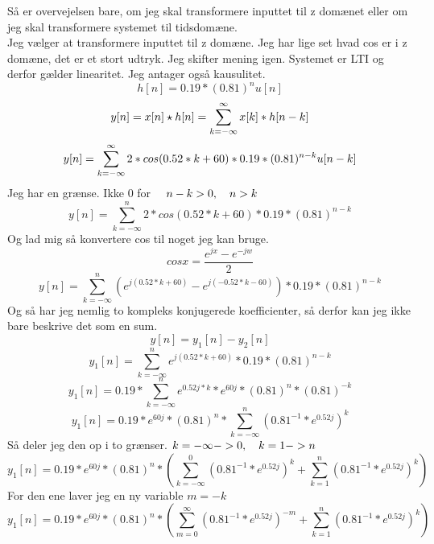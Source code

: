 \begin{Opgaver}
\begin{kapitel}
\begin{Opgave}
            \begin{UnderOpgave}
                \vspace{15pt}
            \end{UnderOpgave}
            \begin{Udklip}
                \begin{UnderOpgave}[\text{Determine analytically the response $y[n]$ to the input $x[n] = 2 cos(0.52n + 60°)$.}]
                    Så er overvejelsen bare, om jeg skal transformere inputtet til z domænet eller om jeg skal transformere systemet til tidsdomæne. \\
                    Jeg vælger at transformere inputtet til z domæne.
                    Jeg har lige set hvad cos er i z domæne, det er et stort udtryk. Jeg skifter mening igen. 
                    Systemet er LTI og derfor gælder linearitet. Jeg antager også kausulitet.
                    \[h[n] = 0.19 * (0.81)^nu[n]\]
                    \[y[n] = x[n]\star h[n] = \sum_{k = -\infty}^{\infty}{x[k]* h[n-k]}\]
                    \[y[n] = \sum_{k = -\infty}^{\infty}{2 * cos(0.52*k + 60) * 0.19 * (0.81)^{n - k}u[n - k]}\]
                    Jeg har en grænse. Ikke 0 for $\tab{0} n - k > 0, \tab{0} n > k$
                    \[y[n] = \sum_{k = -\infty}^{n}{2 * cos(0.52*k + 60) * 0.19 * (0.81)^{n - k}}\]
                    Og lad mig så konvertere cos til noget jeg kan bruge. 
                    \[cosx = \frac{e^{jx} - e^{-jw}}{2}\]
                    \[y[n] = \sum_{k = -\infty}^{n}{(e^{j(0.52*k + 60)} - e^{j(-0.52*k - 60)}) * 0.19 * (0.81)^{n - k}}\]
                    Og så har jeg nemlig to kompleks konjugerede koefficienter, så derfor kan jeg ikke bare beskrive det som en sum. 
                    \[y[n] = y_1[n] - y_2[n]\]
                    \[y_1[n] = \sum_{k = -\infty}^{n}{e^{j(0.52*k + 60)} * 0.19 * (0.81)^{n - k}}\]
                    \[y_1[n] = 0.19 * \sum_{k = -\infty}^{n}{e^{0.52j*k} * e^{60j} * (0.81)^n*(0.81)^{-k}}\]
                    \[y_1[n] = 0.19 * e^{60j} * (0.81)^n * \sum_{k = -\infty}^{n}{(0.81^{-1}*e^{0.52j})^k}\]
                    Så deler jeg den op i to grænser. $k = -\infty -> 0, \tab{0} k = 1 -> n$
                    \[y_1[n] = 0.19 * e^{60j} * (0.81)^n * (\sum_{k = -\infty}^{0}{(0.81^{-1}*e^{0.52j})^k} + \sum_{k = 1}^{n}{(0.81^{-1}*e^{0.52j})^k})\]
                    For den ene laver jeg en ny variable $m = -k$
                    \[y_1[n] = 0.19 * e^{60j} * (0.81)^n * (\sum_{m = 0}^{\infty}{(0.81^{-1}*e^{0.52j})^{-m}} + \sum_{k = 1}^{n}{(0.81^{-1}*e^{0.52j})^k})\]

\end{UnderOpgave}
\end{Udklip}
\end{Opgave}
\end{kapitel}
\end{Opgaver}
